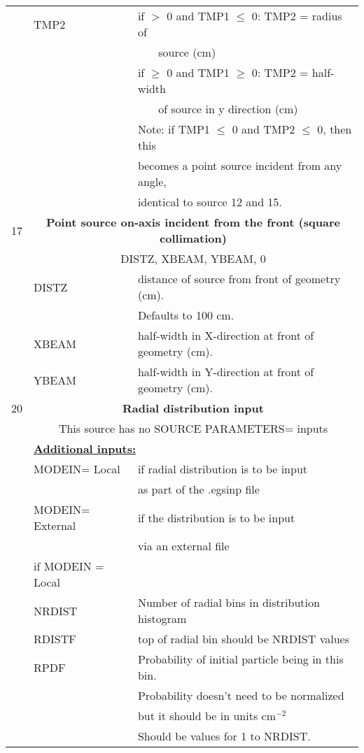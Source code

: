 \begin{longtable}{lll}
  & TMP2    & if $>$ 0 and TMP1 $\leq$ 0: TMP2 = radius of\\
  &         & ~~~ source (cm)\\
  &         & if $\geq$ 0 and TMP1 $\geq$ 0: TMP2 = half-width\\
  &         & ~~~ of source in y direction (cm)\\
  &         & Note: if TMP1 $\leq$ 0 and TMP2 $\leq$ 0, then this\\
  &         & becomes a point source incident from any angle,\\
  &         & identical to source 12 and 15.\\
\hline
17&\multicolumn{2}{c}{\bf Point source on-axis incident from the front (square collimation)}\\
&\multicolumn{2}{c}{DISTZ, XBEAM, YBEAM, 0}\\
& DISTZ & distance of source from front of geometry (cm).\\
&& Defaults to 100 cm.\\
& XBEAM & half-width in X-direction at front of geometry (cm).\\
& YBEAM & half-width in Y-direction at front of geometry (cm).\\
\hline
20&\multicolumn{2}{c}{\bf Radial distribution input}\\
  & \multicolumn{2}{c}{This source has no SOURCE PARAMETERS= inputs}\\
  & \multicolumn{2}{l}{\bf \underline {Additional inputs:}}\\
  & MODEIN= Local & if radial distribution is to be input\\
  &               & as part of the .egsinp file\\
  & MODEIN= External& if the distribution is to be input\\
  &               & via an external file\\
  &if MODEIN = Local &  \\
  & NRDIST       & Number of radial bins in distribution histogram\\
  & RDISTF       & top of radial bin should be NRDIST values \\
  & RPDF         & Probability of initial particle being in this bin.\\
  &              & Probability doesn't need to be normalized\\
  &              & but it should be in units cm$^{-2}$ \\
  &              & Should be values for 1 to NRDIST.\\

\end{longtable}
